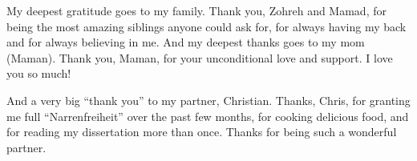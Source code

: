 My deepest gratitude goes to my family. Thank you, Zohreh and Mamad, for being the most amazing siblings anyone could ask for, for always having my back and for always believing in me. And my deepest thanks goes to my mom (Maman). Thank you, Maman, for your unconditional love and support. I love you so much!

And a very big “thank you” to my partner, Christian. Thanks, Chris, for granting me full “Narrenfreiheit” over the past few months, for cooking delicious food, and for reading my dissertation more than once. Thanks for being such a wonderful partner.
